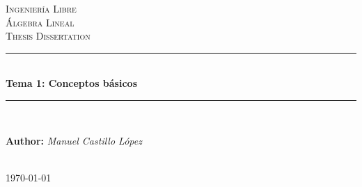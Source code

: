 \newcommand{\HRule}[1]{\rule{\linewidth}{#1}} 
\begin{titlepage}
	\pagestyle{empty}
	\centering


	\textsc{\LARGE Ingeniería Libre}\\[1.5cm]
	\textsc{\Large Álgebra Lineal}\\[1cm]
	\textsc{\large Thesis Dissertation}\\[0.5cm]

	\HRule{1pt}\\[0.4cm]
	{ \huge \bfseries Tema 1: Conceptos básicos}\\[0.4cm]
	\HRule{2pt}\\[1 cm]


	\begin{minipage}{0.8\textwidth}
	 \large
	 \begin{flushright}
	\textbf{Author:} \hfill
	\emph{ Manuel Castillo López}
	\end{flushright}
	\end{minipage}\\[0.2 cm]

	{\large \today}

\end{titlepage}

\thispagestyle{empty}
